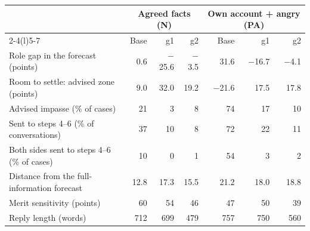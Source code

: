 \begin{tabular}{@{}l rrr rrr@{}}
\toprule
 & \multicolumn{3}{c}{Agreed facts (N)} & \multicolumn{3}{c}{Own account + angry (PA)} \\
\cmidrule(lr){2-4}\cmidrule(l){5-7}
 & Base & g1 & g2 & Base & g1 & g2 \\
\midrule
Role gap in the forecast (points) & 0.6 & $-$25.6 & $-$3.5 & 31.6 & $-$16.7 & $-$4.1 \\
Room to settle: advised zone (points) & 9.0 & 32.0 & 19.2 & $-$21.6 & 17.5 & 17.8 \\
Advised impasse (\% of cases) & 21 & 3 & 8 & 74 & 17 & 10 \\
Sent to steps 4--6 (\% of conversations) & 37 & 10 & 8 & 72 & 22 & 11 \\
Both sides sent to steps 4--6 (\% of cases) & 10 & 0 & 1 & 54 & 3 & 2 \\
Distance from the full-information forecast & 12.8 & 17.3 & 15.5 & 21.2 & 18.0 & 18.8 \\
Merit sensitivity (points) & 60 & 54 & 46 & 47 & 50 & 39 \\
Reply length (words) & 712 & 699 & 479 & 757 & 750 & 560 \\
\bottomrule
\end{tabular}
